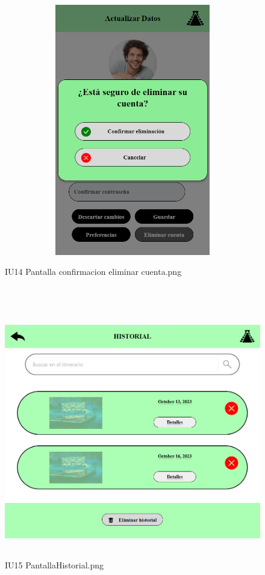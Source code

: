 \begin{figure}[htb]
        \begin{minipage}{1\textwidth}
        \centering
        \includegraphics[width=17cm, height=11cm]{front/PANTALLAS FUNCIONALES 3 DICIEMBRE/IU14_Pantalla confirmacion eliminar cuenta.png}
        \caption{IU14 Pantalla confirmacion eliminar cuenta.png}
    \end{minipage}%
    \\
        \begin{minipage}{1\textwidth}
        \centering
        \includegraphics[width=17cm, height=11cm]{front/PANTALLAS FUNCIONALES 3 DICIEMBRE/IU15_PantallaHistorial.png}
        \caption{IU15 PantallaHistorial.png}
    \end{minipage}%
\end{figure}

